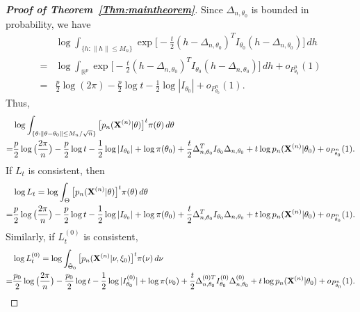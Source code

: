 \documentclass[11pt]{article}
\theoremstyle{plain}
\theoremstyle{definition}
\theoremstyle{remark}
\begin{document}
\begin{appendices}
\begin{proof}[\textbf{Proof of Theorem~\ref{Thm:maintheorem}}]
Since $\Delta_{n,\theta_0}$ is bounded in probability, we have
        $$
            \begin{aligned}
            &\log \int_{\{h:\|h\|\leq M_n\}}\exp\big[ -\frac{t}{2}(h-\Delta_{n,\theta_0})^T I_{\theta_0}(h-\Delta_{n,\theta_0})\big] \, dh
                \\
                =&
                \log \int_{\mathbb{R}^p}\exp\big[ -\frac{t}{2}(h-\Delta_{n,\theta_0})^T I_{\theta_0}(h-\Delta_{n,\theta_0})\big] \, dh+o_{P^n_{\theta_0}}(1)
                \\
                =&
                \frac{p}{2}\log(2\pi)-\frac{p}{2}\log t-\frac{1}{2}\log |I_{\theta_0}|
+o_{P^n_{\theta_0}}(1).
            \end{aligned}
        $$
        Thus,
$$
\begin{aligned}
    &\log \int_{\{\theta:\|\theta-\theta_0\|\leq M_n/\sqrt{n}\}}\big[ p_n(\mathbf{X}^{(n)}|\theta)\big]^t \pi(\theta)\, d\theta\\
    =
    &
        \frac{p}{2}\log\big(\frac{2\pi}{n}\big)-\frac{p}{2}\log t-\frac{1}{2}\log |I_{\theta_0}|
        +\log \pi(\theta_0)
     +
    \frac{t}{2}\Delta_{n,\theta_0}^T I_{\theta_0}\Delta_{n,\theta_0}
    +
    t\log p_n(\mathbf{X}^{(n)}|\theta_0)
    +o_{P^n_{\theta_0}}(1).
\end{aligned}
$$
If $L_t$ is consistent, then
\begin{align*}
    &\log L_t=\log \int_{\Theta}\big[ p_n(\mathbf{X}^{(n)}|\theta)\big]^t \pi(\theta)\, d\theta\\
    =
    &
        \frac{p}{2}\log\big(\frac{2\pi}{n}\big)-\frac{p}{2}\log t-\frac{1}{2}\log |I_{\theta_0}|
        +\log \pi(\theta_0)
     +
    \frac{t}{2}\Delta_{n,\theta_0}^T I_{\theta_0}\Delta_{n,\theta_0}
    +
    t\log p_n(\mathbf{X}^{(n)}|\theta_0)
    +o_{P^n_{\theta_0}}(1).
\end{align*}
Similarly, if $L_t^{(0)}$ is consistent,
\begin{equation*}
\begin{split}
    &\log L_t^{(0)} =\log \int_{\tilde{\Theta}_0}\big[ p_n(\BX^{(n)}|\nu,\xi_0)\big]^t \pi(\nu)\, d\nu\\
    =&
    \frac{p_0}{2}\log\big(\frac{2\pi}{n}\big)-\frac{p_0}{2}\log t-\frac{1}{2}\log |I_{\theta_0}^{(0)}|
                +\log \pi(\nu_0)
             +
             \frac{t}{2}\Delta_{n,\theta_0}^{{(0)}T} I^{(0)}_{\theta_0}\Delta^{(0)}_{n,\theta_0}
            +
            t\log p_n(\BX^{(n)}|\theta_0)
            +o_{P^n_{\theta_0}}(1).
\end{split}

\end{equation*}
\end{proof}
\end{appendices}
\end{document}
